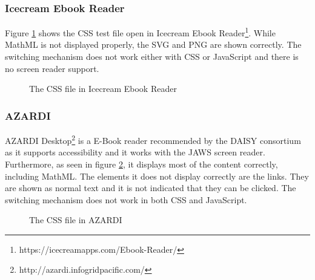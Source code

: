 \subsubsection{Icecream Ebook Reader}
Figure \ref{fig:Icecream} shows the CSS test file open in Icecream Ebook Reader\footnote{https://icecreamapps.com/Ebook-Reader/}. While MathML is not displayed properly, the SVG and PNG are shown correctly. The switching mechanism does not work either with CSS or JavaScript and there is no screen reader support.
\begin{figure}[H]
	\centering
		\caption{The CSS file in Icecream Ebook Reader}
	\label{fig:Icecream}
\end{figure}

\subsubsection{AZARDI}
AZARDI Desktop\footnote{http://azardi.infogridpacific.com/} is a E-Book reader recommended by the DAISY consortium \cite{daisyAZARDI} as it supports accessibility and it works with the JAWS screen reader. Furthermore, as seen in figure \ref{fig:AZARDI}, it displays most of the content correctly, including MathML. The elements it does not display correctly are the links. They are shown as normal text and it is not indicated that they can be clicked. The switching mechanism does not work in both CSS and JavaScript.
\begin{figure}[H]
	\centering
	\caption{The CSS file in AZARDI}
	\label{fig:AZARDI}
\end{figure}

